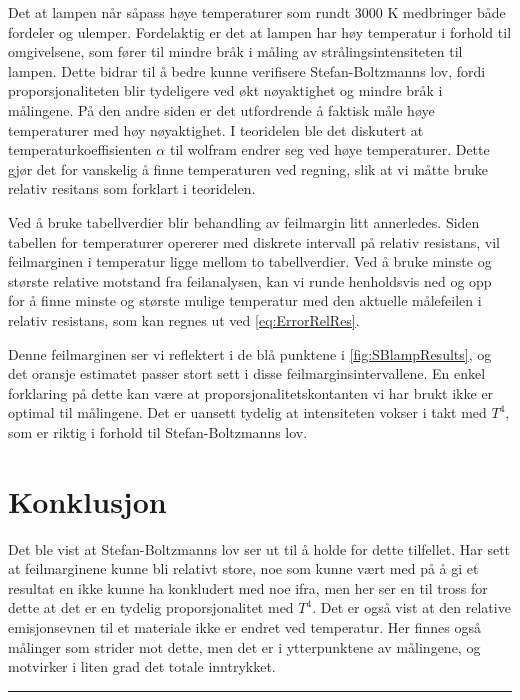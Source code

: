 Det at lampen når såpass høye temperaturer som rundt 3000 K medbringer både fordeler og ulemper. Fordelaktig er det at lampen har høy temperatur i forhold til omgivelsene, som fører til mindre bråk i måling av strålingsintensiteten til lampen. Dette bidrar til å bedre kunne verifisere Stefan-Boltzmanns lov, fordi proporsjonaliteten blir tydeligere ved økt nøyaktighet og mindre bråk i målingene. På den andre siden er det utfordrende å faktisk måle høye temperaturer med høy nøyaktighet. I teoridelen ble det diskutert at temperaturkoeffisienten  $\alpha$ til wolfram endrer seg ved høye temperaturer. Dette gjør det for vanskelig å finne temperaturen ved regning, slik at vi måtte bruke relativ resitans som forklart i teoridelen.

Ved å bruke tabellverdier blir behandling av feilmargin litt annerledes. Siden tabellen for temperaturer opererer med diskrete intervall på relativ resistans, vil feilmarginen i temperatur ligge mellom to tabellverdier. Ved å bruke minste og største relative motstand fra feilanalysen, kan vi runde henholdsvis ned og opp for å finne minste og største mulige temperatur med den aktuelle målefeilen i relativ resistans, som kan regnes ut ved \eqref{eq:ErrorRelRes}. 

Denne feilmarginen ser vi reflektert i de blå punktene i \autoref{fig:SBlampResults}, og det oransje estimatet passer stort sett i disse feilmarginsintervallene. En enkel forklaring på dette kan være at proporsjonalitetskontanten vi har brukt ikke er optimal til målingene. Det er uansett tydelig at intensiteten vokser i takt med $T^4$, som er riktig i forhold til Stefan-Boltzmanns lov.

\section{Konklusjon}
Det ble vist at Stefan-Boltzmanns lov ser ut til å holde for dette tilfellet. Har sett at feilmarginene kunne bli relativt store, noe som kunne vært med på å gi et resultat en ikke kunne ha konkludert med noe ifra, men her ser en til tross for dette at det er en tydelig proporsjonalitet med $T^{4}$. Det er også vist at den relative emisjonsevnen til et materiale ikke er endret ved temperatur. Her finnes også målinger som strider mot dette, men det er i ytterpunktene av målingene, og motvirker i liten grad det totale inntrykket.

\begingroup
\begin{center}
\rule{2cm}{.4pt} %
\end{center}
\makeatletter
{} %
\makeatother


\endgroup


